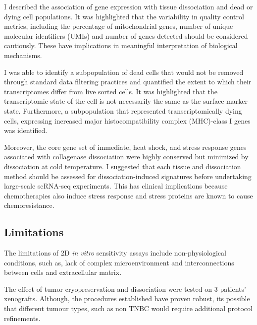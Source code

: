 I described the association of gene expression with tissue dissociation and dead or dying cell populations. It was highlighted that the variability in quality control metrics, including the percentage of mitochondrial genes, number of unique molecular identifiers (UMIs) and number of genes detected should be considered cautiously. These have implications in meaningful interpretation of biological mechanisms.

I was able to identify a subpopulation of dead cells that would not be removed through standard data filtering practices and quantified the extent to which their transcriptomes differ from live sorted cells. It was highlighted that the transcriptomic state of the cell is not necessarily the same as the surface marker state. Furthermore, a subpopulation that represented transcriptomically dying cells, expressing increased major histocompatibility complex (MHC)-class I genes was identified. 
 
  Moreover, the core gene set of immediate, heat shock, and stress response genes associated with collagenase dissociation were highly conserved but minimized by dissociation at cold temperature. I suggested that each tissue and dissociation method should be assessed for dissociation-induced signatures before undertaking large-scale scRNA-seq experiments. This has clinical implications because chemotherapies also induce stress response and stress proteins are known to cause chemoresistance.



\subsection{Limitations}

 The limitations of 2D \textit{in vitro} sensitivity assays include non-physiological conditions, such as, lack of complex microenvironment and interconnections between cells and extracellular matrix. 

 The effect of tumor cryopreservation and dissociation were tested on 3 patients' xenografts. Although, the procedures established have proven robust, its possible that different tumour types, such as non TNBC would require additional protocol refinements.



